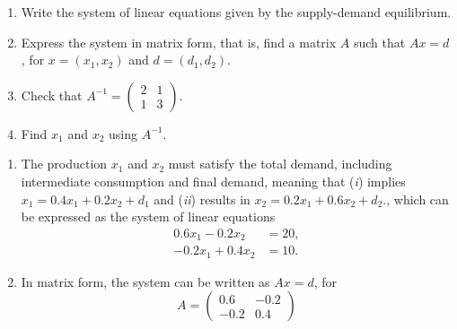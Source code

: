 \documentclass[11pt]{exam}
\begin{document}
\begin{questions}
        \begin{enumerate}[leftmargin = 0.5cm, label = (\alph*), rightmargin = 0.2cm]
        
            \item Write the system of linear equations given by the supply-demand equilibrium.
            
            \item Express the system in matrix form, that is, find a matrix $A$ such that $Ax = d$, for $x = (x_1, x_2)$ and $d =(d_1, d_2)$.

            \item Check that $A^{-1} = 
            \begin{pmatrix}
                2 & 1 \\
                1 & 3 
            \end{pmatrix}$.

            \item Find $x_1$ and $x_2$ using $A^{-1}$. 
        
        \end{enumerate}
    
\begin{solution}[0cm]
    
    \begin{enumerate}[leftmargin = 0.5cm, label = (\alph*), rightmargin = 0.2cm]
        
        \item The production \(x_1\) and \(x_2\) must satisfy the total demand, including intermediate consumption and final demand, meaning that (\textit{i}) implies $x_1 = 0.4x_1 + 0.2x_2 + d_1$ and (\textit{ii}) results in $x_2 = 0.2x_1 + 0.6x_2 + d_2.$, which can be expressed as the system of linear equations
        \begin{align*}
            0.6x_1 - 0.2x_2 &= 20, \\
            -0.2x_1 + 0.4x_2 &= 10.            
        \end{align*}

        \item In matrix form, the system can be written as $Ax = d$, for
        \[
        A = 
        \begin{pmatrix}
        0.6 & -0.2 \\
        -0.2 & 0.4
        \end{pmatrix}
        \]


\end{enumerate}
\end{solution}
\end{questions}
\end{document}
